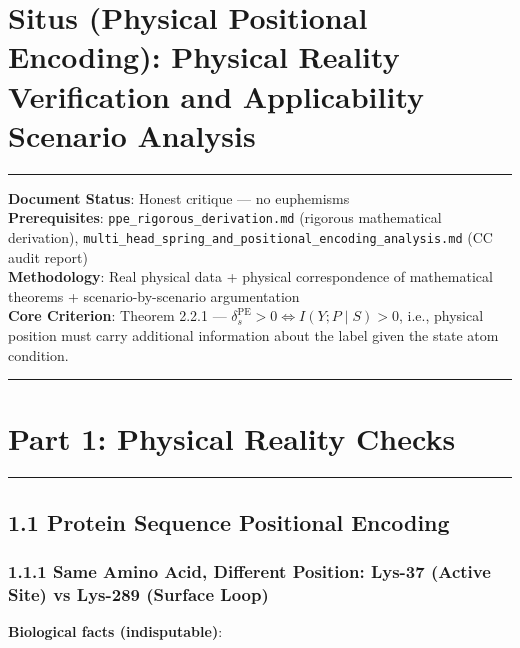 \documentclass[
  12pt,
]{article}
\author{SCX}
\date{2026}
\begin{document}
\section{Situs (Physical Positional Encoding): Physical Reality Verification and Applicability Scenario Analysis}\label{situs-physical-reality-verification}

\begin{center}\rule{0.5\linewidth}{0.5pt}\end{center}

\textbf{Document Status}: Honest critique --- no euphemisms\\
\textbf{Prerequisites}: \texttt{ppe\_rigorous\_derivation.md} (rigorous mathematical derivation), \texttt{multi\_head\_spring\_and\_positional\_encoding\_analysis.md} (CC audit report)\\
\textbf{Methodology}: Real physical data + physical correspondence of mathematical theorems + scenario-by-scenario argumentation\\
\textbf{Core Criterion}: Theorem 2.2.1 --- $\delta_s^{\text{PE}} > 0 \iff I(Y; P \mid S) > 0$, i.e., physical position must carry additional information about the label given the state atom condition.

\begin{center}\rule{0.5\linewidth}{0.5pt}\end{center}

\section{Part 1: Physical Reality Checks}\label{part-1-physical-reality-checks}

\begin{center}\rule{0.5\linewidth}{0.5pt}\end{center}

\subsection{1.1 Protein Sequence Positional Encoding}\label{protein-sequence-positional-encoding}

\subsubsection{1.1.1 Same Amino Acid, Different Position: Lys-37 (Active Site) vs Lys-289 (Surface Loop)}\label{lys-37-vs-lys-289}

\textbf{Biological facts (indisputable)}:
\end{document}
